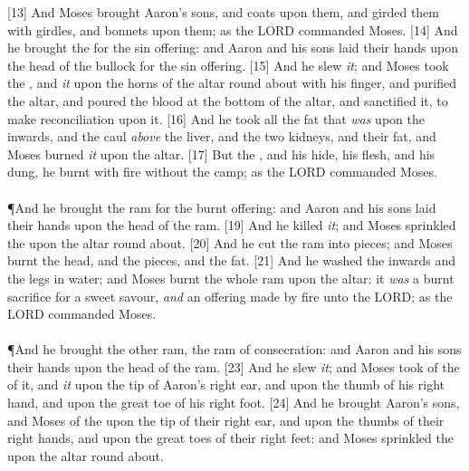 [13] \textcolor[cmyk]{0.99998,1,0,0}{And Moses brought Aaron's sons, and  coats upon them, and girded them with girdles, and  bonnets upon them; as the LORD commanded Moses.}
[14] \textcolor[cmyk]{0.99998,1,0,0}{And he brought the  for the sin offering: and Aaron and his sons laid their hands upon the head of the bullock for the sin offering.}
[15] \textcolor[cmyk]{0.99998,1,0,0}{And he slew \emph{it}; and Moses took the , and  \emph{it} upon the horns of the altar round about with his finger, and purified the altar, and poured the blood at the bottom of the altar, and sanctified it, to make reconciliation upon it.}
[16] \textcolor[cmyk]{0.99998,1,0,0}{And he took all the fat that \emph{was} upon the inwards, and the caul \emph{above} the liver, and the two kidneys, and their fat, and Moses burned \emph{it} upon the altar.}
[17] \textcolor[cmyk]{0.99998,1,0,0}{But the , and his hide, his flesh, and his dung, he burnt with fire without the camp; as the LORD commanded Moses.}\\
\\
\P \textcolor[cmyk]{0.99998,1,0,0}{And he brought the ram for the burnt offering: and Aaron and his sons laid their hands upon the head of the ram.}
[19] \textcolor[cmyk]{0.99998,1,0,0}{And he killed \emph{it}; and Moses sprinkled the  upon the altar round about.}
[20] \textcolor[cmyk]{0.99998,1,0,0}{And he cut the ram into pieces; and Moses burnt the head, and the pieces, and the fat.}
[21] \textcolor[cmyk]{0.99998,1,0,0}{And he washed the inwards and the legs in water; and Moses burnt the whole ram upon the altar: it \emph{was} a burnt sacrifice for a sweet savour, \emph{and} an offering made by fire unto the LORD; as the LORD commanded Moses.}\\
\\
\P \textcolor[cmyk]{0.99998,1,0,0}{And he brought the other ram, the ram of consecration: and Aaron and his sons  their hands upon the head of the ram.}
[23] \textcolor[cmyk]{0.99998,1,0,0}{And he slew \emph{it}; and Moses took of the  of it, and  \emph{it} upon the tip of Aaron's right ear, and upon the thumb of his right hand, and upon the great toe of his right foot.}
[24] \textcolor[cmyk]{0.99998,1,0,0}{And he brought Aaron's sons, and Moses  of the  upon the tip of their right ear, and upon the thumbs of their right hands, and upon the great toes of their right feet: and Moses sprinkled the  upon the altar round about.}
